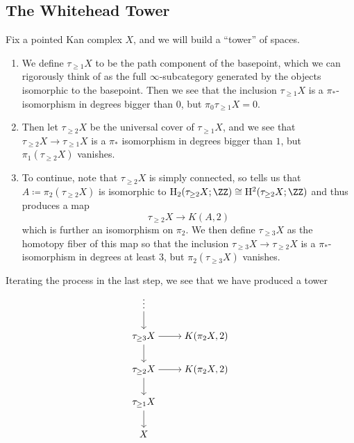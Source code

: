 \documentclass[../notes.tex]{subfiles}
\begin{document}
\subsection{The Whitehead Tower}
Fix a pointed Kan complex $X$, and we will build a ``tower'' of spaces.
\begin{enumerate}
	\item We define $\tau_{\ge1}X$ to be the path component of the basepoint, which we can rigorously think of as the full $\infty$-subcategory generated by the objects isomorphic to the basepoint. Then we see that the inclusion $\tau_{\ge1}X$ is a $\pi_*$-isomorphism in degrees bigger than $0$, but $\pi_0\tau_{\ge1}X=0$.
	\item Then let $\tau_{\ge2}X$ be the universal cover of $\tau_{\ge1}X$, and we see that $\tau_{\ge2}X\to\tau_{\ge1}X$ is a $\pi_*$ isomorphism in degrees bigger than $1$, but $\pi_1(\tau_{\ge2}X)$ vanishes.
	\item To continue, note that $\tau_{\ge2}X$ is simply connected, so  tells us that $A\coloneqq\pi_2(\tau_{\ge2}X)$ is isomorphic to $\mathrm H_2(\tau_{\ge2}X;\ZZ)\cong\mathrm H^2(\tau_{\ge2}X;\ZZ)$ and thus produces a map
	\[\tau_{\ge2}X\to K(A,2)\]
	which is further an isomorphism on $\pi_2$. We then define $\tau_{\ge3}X$ as the homotopy fiber of this map so that the inclusion $\tau_{\ge3}X\to\tau_{\ge2}X$ is a $\pi_*$-isomorphism in degrees at least $3$, but $\pi_2(\tau_{\ge3}X)$ vanishes.
\end{enumerate}
Iterating the process in the last step, we see that we have produced a tower
\begin{equation}
	\begin{tikzcd}[cramped]
		\vdots \\
		{\tau_{\ge3}X} & {K(\pi_2X,2)} \\
		{\tau_{\ge2}X} & {K(\pi_2X,2)} \\
		{\tau_{\ge1}X} \\
		X
		\arrow[from=1-1, to=2-1]
		\arrow[from=2-1, to=2-2]
		\arrow[from=2-1, to=3-1]
		\arrow[from=3-1, to=3-2]
		\arrow[from=3-1, to=4-1]
		\arrow[from=4-1, to=5-1]
	\end{tikzcd} \label{eq:whitehead}
\end{equation}
\end{document}

